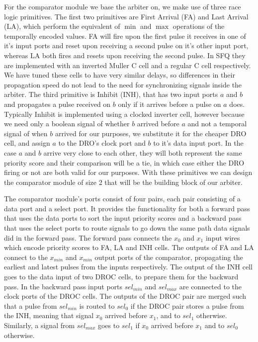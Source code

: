 For the comparator module we base the arbiter on, we make use of three race logic primitives.
The first two primitives are First Arrival (FA) and Last Arrival (LA), which perform the equivalent of $\min$ and $\max$ operations of the temporally encoded values.
FA will fire upon the first pulse it receives in one of it's input ports and reset upon receiving a second pulse on it's other input port, whereas LA both fires and resets upon receiving the second pulse.
In SFQ they are implemented with an inverted Muller C cell and a regular C cell respectively.
We have tuned these cells to have very similar delays, so differences in their propagation speed do not lead to the need for synchronizing signals inside the arbiter.
The third primitive is Inhibit (INH), that has two input ports $a$ and $b$ and propagates a pulse received on $b$ only if it arrives before a pulse on $a$ does.
Typically Inhibit is implemented using a clocked inverter cell, however because we need only a boolean signal of whether $b$ arrived before $a$ and not a temporal signal of when $b$ arrived for our purposes, we substitute it for the cheaper DRO cell, and assign $a$ to the DRO's clock port and $b$ to it's data input port.
In the case $a$ and $b$ arrive very close to each other, they will both represent the same priority score and their comparison will be a tie, in which case either the DRO firing or not are both valid for our purposes.
With these primitives we can design the comparator module of size 2 that will be the building block of our arbiter.

The comparator module's ports consist of four pairs, each pair consisting of a data port and a select port.
It provides the functionality for both a forward pass that uses the data ports to sort the input priority scores and a backward pass that uses the select ports to route signals to go down the same path data signals did in the forward pass.
The forward pass connects the $x_0$ and $x_1$ input wires which encode priority scores to FA, LA and INH cells.
The outputs of FA and LA connect to the $x_{min}$ and $x_{min}$ output ports of the comparator, propagating the earliest and latest pulses from the inputs respectively.
The output of the INH cell goes to the data input of two DROC cells, to prepare them for the backward pass.
In the backward pass input ports $sel_{min}$ and $sel_{max}$ are connected to the clock ports of the DROC cells.
The outputs of the DROC pair are merged such that a pulse from $sel_{min}$ is routed to $sel_0$ if the DROC pair stores a pulse from the INH, meaning that signal $x_0$ arrived before $x_1$, and to $sel_1$ otherwise.
Similarly, a signal from $sel_{max}$ goes to $sel_1$ if $x_0$ arrived before $x_1$ and to $sel_0$ otherwise.

